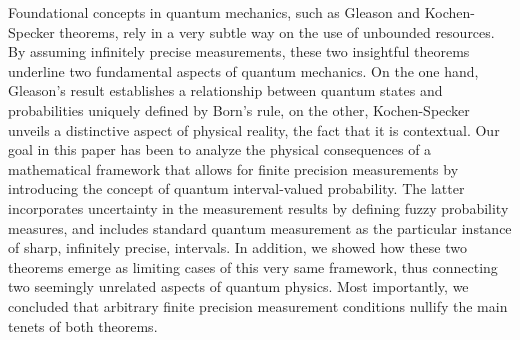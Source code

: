 \documentclass[english,reprint, aps, prl,superscriptaddress, showpacs,
showkeys, longbibliography, amsmath, amssymb]{revtex4-1}
\theoremstyle{plain}
\theoremstyle{definition}
\begin{document}
Foundational concepts in quantum mechanics, such as Gleason and
Kochen-Specker theorems, rely in a very subtle way on the use of
unbounded resources. By assuming infinitely precise measurements,
these two insightful theorems underline two fundamental aspects of
quantum mechanics. On the one hand, Gleason's result establishes a
relationship between quantum states and probabilities uniquely defined
by Born's rule, on the other, Kochen-Specker unveils a distinctive
aspect of physical reality, the fact that it is contextual.  Our goal
in this paper has been to analyze the physical consequences of a
mathematical framework that allows for finite precision measurements
by introducing the concept of quantum interval-valued probability. The
latter incorporates uncertainty in the measurement results by defining
fuzzy probability measures, and includes standard quantum measurement
as the particular instance of sharp, infinitely precise, intervals.
In addition, we showed how these two theorems emerge as limiting cases
of this very same framework, thus connecting two seemingly unrelated
aspects of quantum physics. Most importantly, we concluded that
arbitrary finite precision measurement conditions nullify the main
tenets of both theorems.




\end{document}
